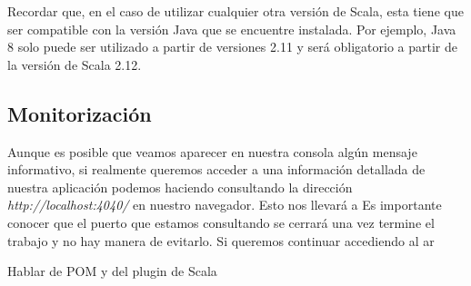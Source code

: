 Recordar que, en el caso de utilizar cualquier otra versión de Scala, esta tiene que ser compatible con la versión Java que se encuentre instalada. Por ejemplo, Java 8 solo puede ser utilizado a partir de versiones 2.11 y será obligatorio a partir de la versión de Scala 2.12. \cite{Scala2.12Roadmap}


\subsection{Monitorización}

Aunque es posible que veamos aparecer en nuestra consola algún mensaje informativo, si realmente queremos acceder a una información detallada de nuestra aplicación podemos haciendo consultando la dirección \textit{http://localhost:4040/} en nuestro navegador. Esto nos llevará a  Es importante conocer que el puerto que estamos consultando se cerrará una vez termine el trabajo y no hay manera de evitarlo. Si queremos continuar accediendo al ar



Hablar de POM y del plugin de Scala